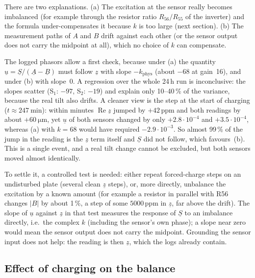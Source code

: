 \documentclass[11pt,a4paper]{article}
\begin{document}
There are two explanations.  (a) The excitation at the sensor really
becomes imbalanced (for example through the resistor ratio $R_{56}/R_{55}$
of the inverter) and the formula under-compensates it because $k$ is too
large (next section).  (b) The measurement paths of $A$ and $B$ drift
against each other (or the sensor output does not carry the midpoint at
all), which no choice of $k$ can compensate.

The logged phasors allow a first check, because under (a) the quantity
$\underline{u}=\underline{S}/(\underline{A}-\underline{B})$ must follow
$\underline{z}$ with slope $-k_{\mathrm{phys}}$ (about $-68$ at gain~16),
and under (b) with slope~0.  A regression over the whole 24\,h run is
inconclusive: the slopes scatter (S$_1$: $-97$, S$_2$: $-19$) and explain only
10--40\,\% of the variance, because the real tilt also drifts.  A cleaner
view is the step at the start of charging ($t\approx\SI{247}{\minute}$):
within minutes $\operatorname{Re}\underline{z}$ jumped by $+42$\,ppm and both
readings by about $+\SI{60}{\micro\metre}$, yet $\underline{u}$ of both
sensors changed by only $+2.8\cdot10^{-4}$ and $+3.5\cdot10^{-4}$, whereas
(a) with $k=68$ would have required $-2.9\cdot10^{-3}$.  So almost 99\,\% of
the jump in the reading is the $\underline{z}$ term itself and $\underline{S}$
did not follow, which favours~(b).  This is a single event, and a real tilt
change cannot be excluded, but both sensors moved almost identically.

To settle it, a controlled test is needed: either repeat forced-charge steps
on an undisturbed plate (several clean $\underline{z}$ steps), or, more
directly, unbalance the excitation by a known amount (for example a resistor
in parallel with R56 changes $|B|$ by about 1\,\%, a step of some
$5000$\,ppm in $\underline{z}$, far above the drift).  The slope of
$\underline{u}$ against $\underline{z}$ in that test measures the response of
$\underline{S}$ to an imbalance directly, i.e.\ the complex $k$ (including
the sensor's own phase); a slope near zero would mean the sensor output does
not carry the midpoint.  Grounding the sensor input does not help: the
reading is then $\underline{z}$, which the logs already contain.

\subsection{Effect of charging on the balance}
\end{document}
